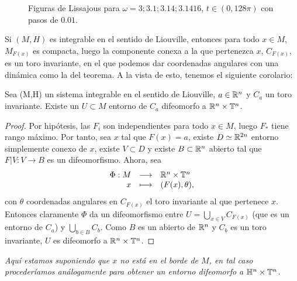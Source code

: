 \begin{obs}
\begin{figure}[h]
  \caption{Figuras de Lissajous para $\omega=3;3.1;3.14;3.1416$, $t \in (0,128\pi)$ con pasos de $0.01$.}
  \label{fig:lissajous}
\end{figure}
\end{obs}

Si $(M,H)$ es integrable en el sentido de Liouville, entonces para todo $x \in M$, $M_{F(x)}$ es compacta, luego la componente conexa a la que pertenezca $x$, $C_{F(x)}$, es un toro invariante, en el que podemos dar coordenadas angulares con una dinámica como la del teorema. A la vista de esto, tenemos el siguiente corolario:

\begin{corol}
  Sea (M,H) un sistema integrable en el sentido de Liouville, $a \in \mathbb{R}^n$ y $C_a$ un toro invariante. Existe un $U \subset M$ entorno de $C_a$ difeomorfo a $\mathbb{R}^n \times \mathbb{T}^n$. 
\end{corol}

\begin{proof}
  Por hipótesis, las $F_i$ son independientes para todo $x \in M$, luego $F_*$ tiene rango máximo. Por tanto, sea $x$ tal que $F(x)=a$, existe $D\simeq \mathbb{R}^{2n}$ entorno simplemente conexo de $x$, existe $V\subset D$ y existe $B\subset \mathbb{R}^n$ abierto tal que $F|V:V \rightarrow B$ es un difeomorfismo. Ahora, sea
  \[
    \begin{array}{rcl}
      \Phi:M & \longrightarrow & \mathbb{R}^n \times \mathbb{T}^n \\
           x & \longmapsto & (F(x), \theta),
    \end{array}
  \]
  con $\theta$ coordenadas angulares en $C_{F(x)}$ el toro invariante al que pertenece $x$. Entonces claramente $\Phi$ da un difeomorfismo entre $U=\bigcup_{x\in V}C_{F(x)}$ (que es un entorno de $C_a$) y $\bigcup_{b \in B} C_b$. Como $B$ es un abierto de $\mathbb{R}^n$ y $C_b$ es un toro invariante, $U$ es difeomorfo a $\mathbb{R}^n \times \mathbb{T}^n$.
\end{proof}
\begin{obs}
  \em
  Aquí estamos suponiendo que $x$ no está en el borde de $M$, en tal caso procederíamos análogamente para obtener un entorno difeomorfo a $\mathbb{H}^n \times \mathbb{T}^n$.
\end{obs}

